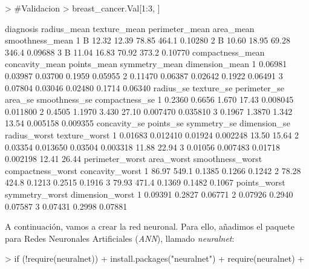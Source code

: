 \documentclass [a4paper] {article}
\begin{document}
\newpage
\begin{Schunk}
\begin{Sinput}
> #Validacion
> breast_cancer.Val[1:3, ]
\end{Sinput}
\begin{Soutput}
  diagnosis radius_mean texture_mean perimeter_mean area_mean smoothness_mean
1         B       12.32        12.39          78.85     464.1         0.10280
2         B       10.60        18.95          69.28     346.4         0.09688
3         B       11.04        16.83          70.92     373.2         0.10770
  compactness_mean concavity_mean points_mean symmetry_mean dimension_mean
1          0.06981        0.03987     0.03700        0.1959        0.05955
2          0.11470        0.06387     0.02642        0.1922        0.06491
3          0.07804        0.03046     0.02480        0.1714        0.06340
  radius_se texture_se perimeter_se area_se smoothness_se compactness_se
1    0.2360     0.6656        1.670   17.43      0.008045       0.011800
2    0.4505     1.1970        3.430   27.10      0.007470       0.035810
3    0.1967     1.3870        1.342   13.54      0.005158       0.009355
  concavity_se points_se symmetry_se dimension_se radius_worst texture_worst
1      0.01683  0.012410     0.01924     0.002248        13.50         15.64
2      0.03354  0.013650     0.03504     0.003318        11.88         22.94
3      0.01056  0.007483     0.01718     0.002198        12.41         26.44
  perimeter_worst area_worst smoothness_worst compactness_worst concavity_worst
1           86.97      549.1           0.1385            0.1266          0.1242
2           78.28      424.8           0.1213            0.2515          0.1916
3           79.93      471.4           0.1369            0.1482          0.1067
  points_worst symmetry_worst dimension_worst
1      0.09391         0.2827         0.06771
2      0.07926         0.2940         0.07587
3      0.07431         0.2998         0.07881
\end{Soutput}
\end{Schunk}

A continuación, vamos a crear la red neuronal. Para ello, añadimos el paquete para Redes Neuronales Artificiales (\textit{ANN}), llamado \textit{neuralnet}:
\begin{Schunk}
\begin{Sinput}
> if (!require(neuralnet)){
+ 	install.packages("neuralnet")
+ 	require(neuralnet)
+ }
\end{Sinput}
\end{Schunk}
\end{document}

